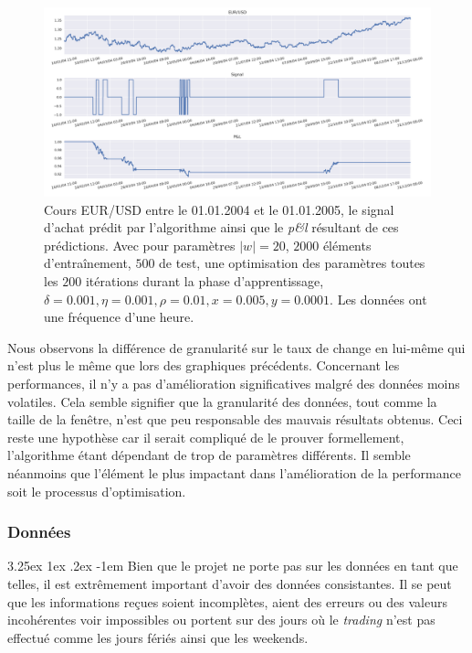 \documentclass[a4paper, 11pt]{article}
\makeatletter
\renewcommand\paragraph{\@startsection{paragraph}{5}{\z@}%
  {3.25ex \@plus1ex \@minus.2ex}%
  {-1em}%
  {\normalfont\normalsize\bfseries}}
\makeatother
\begin{document}
\begin{figure}
	\centering
		\includegraphics[scale=0.5]{res/eursud_2004-2005-hours}
	\caption{Cours EUR/USD entre le 01.01.2004 et le 01.01.2005, le signal d'achat prédit par l'algorithme ainsi que le \textit{p\&l} résultant de ces prédictions. Avec pour paramètres $|w| = 20$, $2000$ éléments d'entraînement, $500$ de test, une optimisation des
		paramètres toutes les $200$ itérations durant la phase d'apprentissage, $\delta = 0.001, \eta=0.001,\rho=0.01, x = 0.005, y=0.0001$. Les données ont une fréquence d'une heure.}
	\label{eurusd 2004 2005 hours}
\end{figure}
\clearpage

Nous observons la différence de granularité sur le taux de change en lui-même qui n'est plus le même que lors des graphiques précédents. Concernant les performances, il n'y a pas d'amélioration significatives malgré des données moins volatiles. Cela semble signifier que la granularité des données, tout comme la taille de la fenêtre, n'est que peu responsable des mauvais résultats obtenus. Ceci reste une hypothèse car il serait compliqué de le prouver formellement, l'algorithme étant dépendant de trop de paramètres différents. Il semble néanmoins que l'élément le plus impactant dans l'amélioration de la performance soit le processus d'optimisation.

\subsubsection{Données}

\paragraph{}
Bien que le projet ne porte pas sur les données en tant que telles, il est extrêmement important d'avoir des données consistantes. Il se peut que les informations reçues soient incomplètes, aient des erreurs ou des valeurs incohérentes voir impossibles ou portent sur des jours où le \textit{trading} n'est pas effectué comme les jours fériés ainsi que les weekends.
\end{document}
